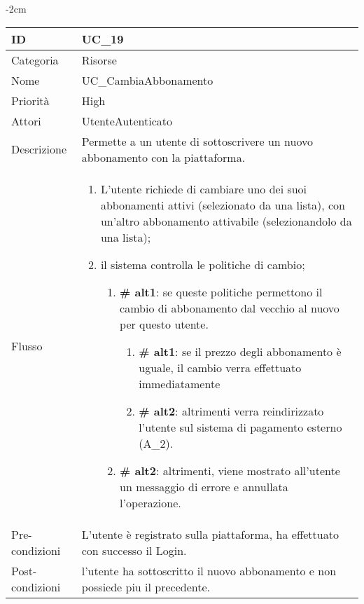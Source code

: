 \begin{center}
\begin{table}[bp]
    \centering
    \addtolength{\leftskip} {-2cm}
\begin{tabular}{ |p{2.6cm}|p{13cm}|  }
\hline
ID & UC\_19 \\\hline
Categoria & Risorse\\\hline
Nome & UC\_CambiaAbbonamento\\\hline
Priorità & High \\\hline
Attori &  UtenteAutenticato \\\hline
Descrizione & Permette a un utente di sottoscrivere un nuovo abbonamento con la piattaforma.\\\hline
Flusso &  	\vspace{-5mm} \begin{enumerate}
			\item L'utente richiede di cambiare uno dei suoi abbonamenti attivi (selezionato da una lista), con un'altro abbonamento attivabile (selezionandolo da una lista);
			\item il sistema controlla le politiche di cambio;
			\begin{enumerate}[  ]
				\item \textbf{\# alt1}: se queste politiche permettono il cambio di abbonamento dal vecchio al nuovo per questo utente.
				\begin{enumerate}[label=\arabic*]
					\item \textbf{\# alt1}: se il prezzo degli abbonamento è uguale, il cambio verra effettuato immediatamente
					\item \textbf{\# alt2}: altrimenti verra reindirizzato l'utente sul sistema di pagamento esterno (A\_2).
				\end{enumerate}
				\item \textbf{\# alt2}: altrimenti, viene mostrato all'utente un messaggio di errore e annullata l'operazione.
			\end{enumerate}
			\end{enumerate}\\\hline
Pre-condizioni & L'utente è registrato sulla piattaforma, ha effettuato con successo il Login.\\\hline
Post-condizioni &  l'utente ha sottoscritto il nuovo abbonamento e non possiede piu il precedente.\\\hline
\end{tabular}
\label{table_use_case:19}\newline
\end{table}




\end{center}

